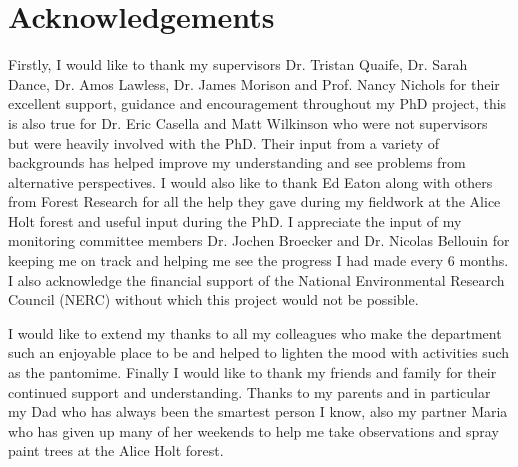 \chapter*{\centering \Large \vspace{-20mm}\Huge Acknowledgements}

Firstly, I would like to thank my supervisors Dr. Tristan Quaife, Dr. Sarah Dance, Dr. Amos Lawless, Dr. James Morison and Prof. Nancy Nichols for their excellent support, guidance and encouragement throughout my PhD project, this is also true for Dr. Eric Casella and Matt Wilkinson who were not supervisors but were heavily involved with the PhD. Their input from a variety of backgrounds has helped improve my understanding and see problems from alternative perspectives. I would also like to thank Ed Eaton along with others from Forest Research for all the help they gave during my fieldwork at the Alice Holt forest and useful input during the PhD. I appreciate the input of my monitoring committee members Dr. Jochen Broecker and Dr. Nicolas Bellouin for keeping me on track and helping me see the progress I had made every 6 months. I also acknowledge the financial support of the National Environmental Research Council (NERC) without which this project would not be possible.

I would like to extend my thanks to all my colleagues who make the department such an enjoyable place to be and helped to lighten the mood with activities such as the pantomime. Finally I would like to thank my friends and family for their continued support and understanding. Thanks to my parents and in particular my Dad who has always been the smartest person I know, also my partner Maria who has given up many of her weekends to help me take observations and spray paint trees at the Alice Holt forest.  

   

\vspace{2cm}

\newpage

